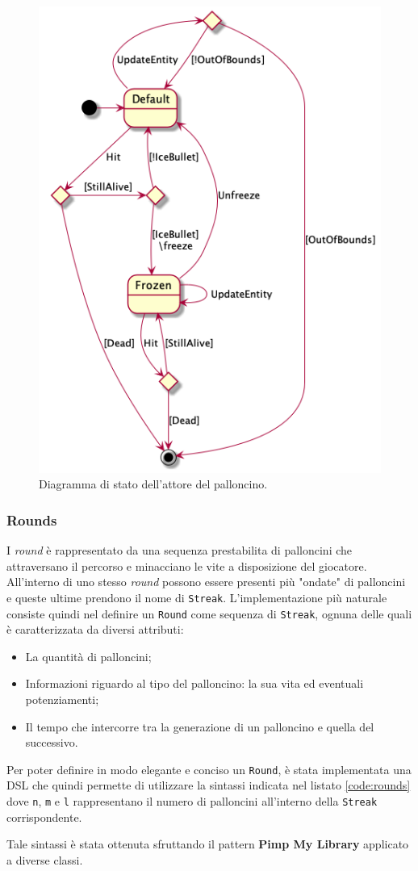 \begin{figure}[H]
    \centering
    \includegraphics[width=.5\linewidth]{img/state-balloon-actor}
    \caption{Diagramma di stato dell'attore del palloncino.}
    \label{fig:state-balloon-actor}
\end{figure}

\subsubsection{Rounds}
I \textit{round} è rappresentato da una sequenza prestabilita di palloncini che attraversano il percorso e minacciano le
vite a disposizione del giocatore. All'interno di uno stesso \textit{round} possono essere presenti più "ondate" di
palloncini e queste ultime prendono il nome di \texttt{Streak}. L'implementazione più naturale consiste quindi nel
definire un \texttt{Round} come sequenza di \texttt{Streak}, ognuna delle quali è caratterizzata da diversi attributi:
\begin{itemize}
    \item La quantità di palloncini;
    \item Informazioni riguardo al tipo del palloncino: la sua vita ed eventuali potenziamenti;
    \item Il tempo che intercorre tra la generazione di un palloncino e quella del successivo.
\end{itemize}

Per poter definire in modo elegante e conciso un \texttt{Round}, è stata implementata una DSL che quindi permette di
utilizzare la sintassi indicata nel listato \ref{code:rounds} dove \texttt{n}, \texttt{m} e \texttt{l} rappresentano il
numero di palloncini all'interno della \texttt{Streak} corrispondente.

Tale sintassi è stata ottenuta sfruttando il pattern \textbf{Pimp My Library} applicato a diverse classi.

